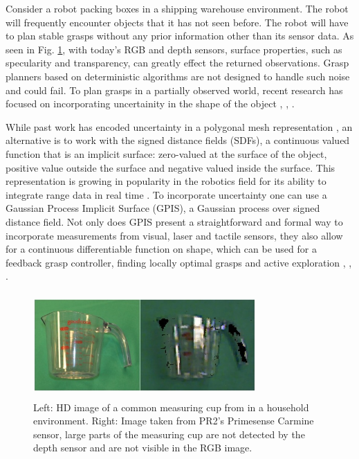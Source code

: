 \documentclass[letterpaper, 10 pt, conference]{ieeeconf}  %
\begin{document}
Consider a robot packing boxes in a shipping warehouse environment. The robot will frequently encounter objects that it has not seen before. The robot will have to plan stable grasps without any prior information other than its sensor data. As seen in Fig. \ref{fig:noisy data}, with today's RGB and depth sensors, surface properties, such as specularity and transparency, can greatly effect the returned observations. Grasp planners based on deterministic algorithms are not designed to handle such noise and could fail. To plan grasps in a partially observed world, recent research has focused on incorporating uncertainity%
 in the shape of the object \cite{kehoe2012estimating}, \cite{christopoulos2007handling}, \cite{zheng2005}. %

While past work has encoded uncertainty in a polygonal mesh representation \cite{kehoe2012estimating}, an alternative is to work with the signed distance fields (SDFs), a continuous valued function that is an implicit surface: zero-valued at the surface of the object, positive value outside the surface and negative valued inside the surface. This representation is growing in popularity in the robotics field for its ability to integrate range data in real time \cite{newcombe2011kinectfusion}\cite{curless1996volumetric}. To incorporate uncertainty one can use a Gaussian Process Implicit Surface (GPIS), a Gaussian process over signed distance field. Not only does GPIS present a straightforward and formal way to incorporate measurements from visual, laser and tactile sensors, they  also allow for a continuous differentiable function on shape, 
which can be used for a feedback grasp controller, finding locally optimal grasps and active exploration  \cite{dragiev2011}, \cite{jeffs}, \cite{hollinger2013}. 
 
\begin{figure}[ht!]
\centering
\includegraphics[width=8.5cm,height=4cm]{figures/Slide02.jpg}
\caption{Left: HD image of a common measuring cup from in a household environment. Right: Image taken from PR2's Primesense Carmine sensor, large parts of the measuring cup are not detected by the depth sensor and are not visible in the RGB image.}
\vspace*{-10pt}
\label{fig:noisy data}
\end{figure}
\end{document}
